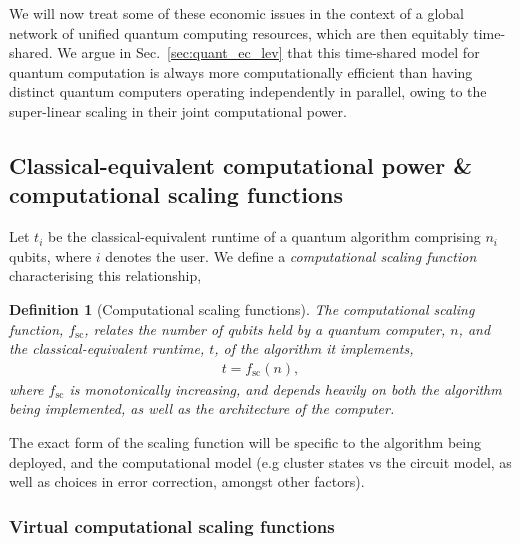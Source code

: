 \documentclass[aps, rmp, twocolumn, amsmath, amssymb, nofootinbib, superscriptaddress, longbibliography, floatfix, table-of-contents, eqsecnum]{revtex4-1}
\newtheorem{definition}{Definition}
\begin{document}
We will now treat some of these economic issues in the context of a global network of unified quantum computing resources, which are then equitably time-shared. We argue in Sec.~\ref{sec:quant_ec_lev} that this time-shared model for quantum computation is always more computationally efficient than having distinct quantum computers operating independently in parallel, owing to the super-linear scaling in their joint computational power.

%
%

\subsection{Classical-equivalent computational power \& computational scaling functions}

Let $t_i$ be the classical-equivalent runtime of a quantum algorithm comprising $n_i$ qubits, where $i$ denotes the user. We define a \textit{computational scaling function} characterising this relationship,

\begin{definition}[Computational scaling functions] \label{def:scaling_func} 
The computational scaling function, $f_\text{sc}$, relates the number of qubits held by a quantum computer, $n$, and the classical-equivalent runtime, $t$, of the algorithm it implements,
\begin{align}
t = f_\text{sc}(n),
\end{align}
	where $f_\text{sc}$ is monotonically increasing, and depends heavily on both the algorithm being implemented, as well as the architecture of the computer.
\end{definition}

The exact form of the scaling function will be specific to the algorithm being deployed, and the computational model (e.g cluster states vs the circuit model, as well as choices in error correction, amongst other factors).

%
%

\subsubsection{Virtual computational scaling functions}
\end{document}
